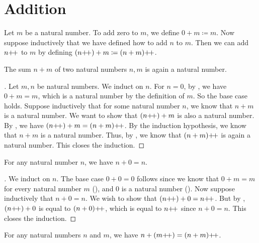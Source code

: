 \section{Addition}\label{i:sec:2.2}

\begin{defn}\label{i:2.2.1}
  Let \(m\) be a natural number.
  To add zero to \(m\), we define \(0 + m \coloneqq m\).
  Now suppose inductively that we have defined how to add \(n\) to \(m\).
  Then we can add \(n{+}\!{+}\) to \(m\) by defining \((n{+}\!{+}) + m \coloneqq (n + m){+}\!{+}\).
\end{defn}

\begin{ac}\label{i:ac:2.2.1}
  The sum \(n + m\) of two natural numbers \(n, m\) is again a natural number.
\end{ac}

\begin{proof}[]
  Let \(m, n\) be natural numbers.
  We induct on \(n\).
  For \(n = 0\), by , we have \(0 + m = m\), which is a natural number by the definition of \(m\).
  So the base case holds.
  Suppose inductively that for some natural number \(n\), we know that \(n + m\) is a natural number.
  We want to show that \((n{+}\!{+}) + m\) is also a natural number.
  By , we have \((n{+}\!{+}) + m = (n + m){+}\!{+}\).
  By the induction hypothesis, we know that \(n + m\) is a natural number.
  Thus, by , we know that \((n + m){+}\!{+}\) is again a natural number.
  This closes the induction.
\end{proof}

\begin{lem}\label{i:2.2.2}
  For any natural number \(n\), we have \(n + 0 = n\).
\end{lem}

\begin{proof}[]
  We induct on \(n\).
  The base case \(0 + 0 = 0\) follows since we know that \(0 + m = m\) for every natural number \(m\) (), and \(0\) is a natural number ().
  Now suppose inductively that \(n + 0 = n\).
  We wish to show that \((n{+}\!{+}) + 0 = n{+}\!{+}\).
  But by , \((n{+}\!{+}) + 0\) is equal to \((n + 0){+}\!{+}\), which is equal to \(n{+}\!{+}\) since \(n + 0 = n\).
  This closes the induction.
\end{proof}

\begin{lem}\label{i:2.2.3}
  For any natural numbers \(n\) and \(m\), we have \(n + (m{+}\!{+}) = (n + m){+}\!{+}\).
\end{lem}

